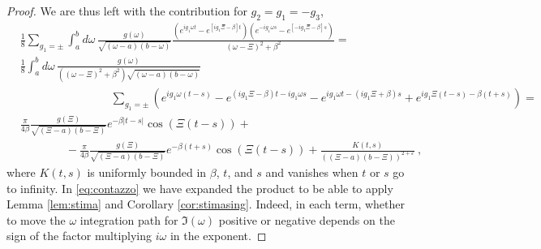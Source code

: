 \documentclass[10pt,a4paper]{amsart}
\newcommand{\dam}{\beta}
\newcommand{\e}{\varepsilon}
\begin{document}
\begin{proof}
We are thus left with the contribution for $g_2=g_1=-g_3$, 
\begin{equation}\label{eq:contazzo}
\begin{aligned}
&\frac 18\sum_{g_1=\pm}\int_{a}^{b}d\omega\, \frac{g(\omega)}{\sqrt{(\omega-a)(b-\omega)}}
\frac{\left(e^{ig_1\omega t}-e^{[ig_1\Xi-\dam]t}\right)\left(e^{-ig_1\omega 
s}-e^{[-ig_1\Xi-\dam]s}\right)}{(\omega-\Xi)^2+\beta^2}=\\
&\frac 18\int_{a}^{b}d\omega\, \frac{g(\omega)}{((\omega-\Xi)^2+\dam^2) \sqrt{(\omega-a)(b-\omega)}}\\
&\qquad\qquad\qquad\qquad\sum_{g_1=\pm}\left(e^{ig_1\omega(t-s)}-e^{(ig_1\Xi-\dam)t-ig_1\omega s}-e^{ig_1\omega t - 
(ig_1\Xi+\dam)s}+
e^{ig_1\Xi(t-s)-\dam(t+s)}\right)=\\
&\frac {\pi}{4\dam}\frac{g(\Xi)}{\sqrt{(\Xi-a)(b-\Xi)}}e^{-\dam|t-s|}\cos(\Xi(t-s))+\\
&\qquad\qquad
-\frac
\pi{4\dam}\frac{g(\Xi)}{\sqrt{(\Xi-a)(b-\Xi)}}
e^{-\dam(t+s)}\cos(\Xi(t-s))+\frac{K(t,s)}{\left((\Xi-a)(b-\Xi)\right)^{2+\e}}\ , 
\end{aligned}
\end{equation}
where $K(t,s)$ is uniformly bounded in $\dam$, $t$, and $s$ and vanishes when $t$ or $s$ go to infinity. In 
\eqref{eq:contazzo} we have expanded the product to be able to apply Lemma \ref{lem:stima} and Corollary 
\ref{cor:stimasing}. Indeed, in each term, whether to move the $\omega$ integration path for $\Im(\omega)$ positive or 
negative depends on the sign of the factor multiplying $i\omega$ in
the exponent.

\end{proof}
\end{document}
